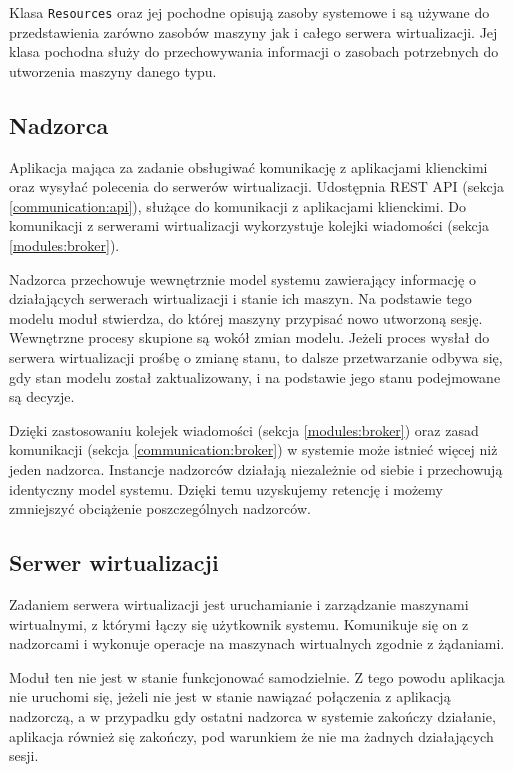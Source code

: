 \documentclass[../opis-rozwiazania.tex]{subfiles}
\begin{document}
Klasa \texttt{Resources} oraz jej pochodne opisują zasoby systemowe i są używane do przedstawienia zarówno zasobów maszyny jak i całego serwera wirtualizacji. Jej klasa pochodna \texttt{} służy do przechowywania informacji o zasobach potrzebnych do utworzenia maszyny danego typu.

\subsection{Nadzorca}
\label{modules:overseer}

Aplikacja mająca za zadanie obsługiwać komunikację z aplikacjami klienckimi oraz wysyłać polecenia do serwerów wirtualizacji. Udostępnia REST API (sekcja \ref{communication:api}), służące do komunikacji z aplikacjami klienckimi. Do komunikacji z serwerami wirtualizacji wykorzystuje kolejki wiadomości (sekcja \ref{modules:broker}).

Nadzorca przechowuje wewnętrznie model systemu zawierający informację o działających serwerach wirtualizacji i stanie ich maszyn. Na podstawie tego modelu moduł stwierdza, do której maszyny przypisać nowo utworzoną sesję. Wewnętrzne procesy skupione są wokół zmian modelu. Jeżeli proces wysłał do serwera wirtualizacji prośbę o zmianę stanu, to dalsze przetwarzanie odbywa się, gdy stan modelu został zaktualizowany, i na podstawie jego stanu podejmowane są decyzje.

Dzięki zastosowaniu kolejek wiadomości (sekcja \ref{modules:broker}) oraz zasad komunikacji (sekcja \ref{communication:broker}) w systemie może istnieć więcej niż jeden nadzorca. Instancje nadzorców działają niezależnie od siebie i przechowują identyczny model systemu. Dzięki temu uzyskujemy retencję i możemy zmniejszyć obciążenie poszczególnych nadzorców.

\subsection{Serwer wirtualizacji}
\label{modules:virtsrv}

Zadaniem serwera wirtualizacji jest uruchamianie i zarządzanie maszynami wirtualnymi, z którymi łączy się użytkownik systemu. Komunikuje się on z nadzorcami i wykonuje operacje na maszynach wirtualnych zgodnie z żądaniami.

Moduł ten nie jest w stanie funkcjonować samodzielnie. Z tego powodu aplikacja nie uruchomi się, jeżeli nie jest w stanie nawiązać połączenia z aplikacją nadzorczą, a w przypadku gdy ostatni nadzorca w systemie zakończy działanie, aplikacja również się zakończy, pod warunkiem że nie ma żadnych działających sesji.
\end{document}
